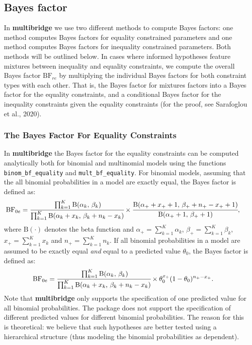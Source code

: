 \documentclass[
  english,
  man,floatsintext]{apa6}
\begin{document}
\hypertarget{bayes-factor}{%
\subsection{Bayes factor}\label{bayes-factor}}

\noindent In \textbf{multibridge} we use two different methods to compute Bayes factors: one method computes Bayes factors for equality constrained parameters and one method computes Bayes factors for inequality constrained parameters. Both methods will be outlined below. In cases where informed hypotheses feature mixtures between inequality and equality constraints, we compute the overall Bayes factor \(\text{BF}_{re}\) by multiplying the individual Bayes factors for both constraint types with each other. That is, the Bayes factor for mixtures factors into a Bayes factor for the equality constraints, and a conditional Bayes factor for the inequality constraints given the equality constraints (for the proof, see Sarafoglou et al., 2020).

\hypertarget{the-bayes-factor-for-equality-constraints}{%
\subsubsection{The Bayes Factor For Equality Constraints}\label{the-bayes-factor-for-equality-constraints}}

\noindent In \textbf{multibridge} the Bayes factor for the equality constraints can be computed analytically both for binomial and multinomial models using the functions \texttt{binom\_bf\_equality} and \texttt{mult\_bf\_equality}. For binomial models, assuming that the all binomial probabilities in a model are exactly equal, the Bayes factor is defined as:
\begin{align*}
\text{BF}_{0e}
&= \cfrac{\prod_{k=1}^K \text{B}(\alpha_k \text{, } \beta_k)}{\prod_{k=1}^K \text{B}(\alpha_k + x_k\text{, } \beta_k + n_k - x_k)} \times \cfrac{\text{B}(\alpha_+ + x_+ + 1\text{, } \beta_+ + n_+ - x_+ + 1)}{\text{B}(\alpha_+ + 1\text{, }\beta_+ + 1)},
\end{align*}
where \(\text{B}(\cdot)\) denotes the beta function and \(\alpha_+ = \sum_{k=1}^K\alpha_k\), \(\beta_+ = \sum_{k=1}^K\beta_k\), \(x_+ = \sum_{k=1}^K x_k\) and \(n_+ = \sum_{k=1}^K n_k\). If all binomial probabilities in a model are assumed to be exactly equal \textit{and} equal to a predicted value \(\theta_{0}\), the Bayes factor is defined as:
\begin{align*}
\text{BF}_{0e}
&= \cfrac{\prod_{k=1}^K \text{B}(\alpha_k \text{, } \beta_k)}{\prod_{k=1}^K \text{B}(\alpha_k + x_k\text{, } \beta_k + n_k - x_k)} \times \theta_{0}^{x_+} (1 - \theta_{0})^{n_+ - x_+}.
\end{align*}
Note that \textbf{multibridge} only supports the specification of one predicted value for all binomial probabilities. The package does not support the specification of different predicted values for different binomial probabilities. The reason for this is theoretical: we believe that such hypotheses are better tested using a hierarchical structure (thus modeling the binomial probabilities as dependent).
\end{document}
